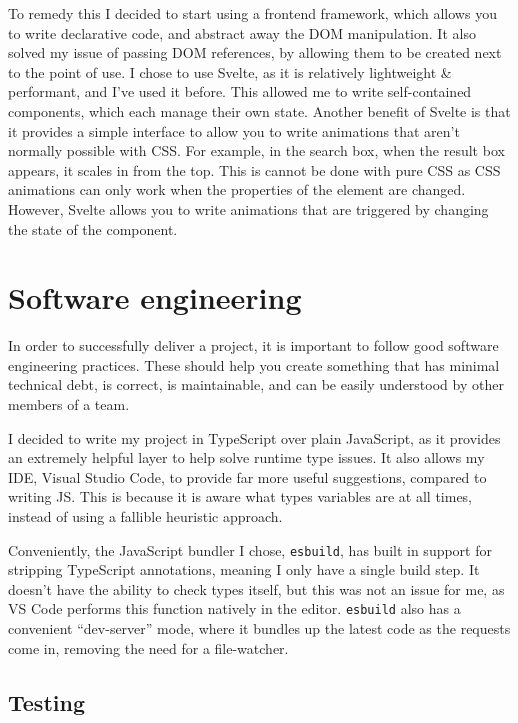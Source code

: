 \documentclass[hyphens]{final_report}
\begin{document}
To remedy this I decided to start using a frontend framework, which allows you to write declarative code, and abstract away the DOM manipulation. It also solved my issue of passing DOM references, by allowing them to be created next to the point of use. I chose to use Svelte, as it is relatively lightweight \& performant, and I've used it before. This allowed me to write self-contained components, which each manage their own state. Another benefit of Svelte is that it provides a simple interface to allow you to write animations that aren't normally possible with CSS\@. For example, in the search box, when the result box appears, it scales in from the top. This is cannot be done with pure CSS as CSS animations can only work when the properties of the element are changed. However, Svelte allows you to write animations that are triggered by changing the state of the component.



\clearpage
\chapter{Software engineering}\label{sec:software-engineering}

In order to successfully deliver a project, it is important to follow good software engineering practices. These should help you create something that has minimal technical debt, is correct, is maintainable, and can be easily understood by other members of a team.

I decided to write my project in TypeScript over plain JavaScript, as it provides an extremely helpful layer to help solve runtime type issues. It also allows my IDE, Visual Studio Code, to provide far more useful suggestions, compared to writing JS\@. This is because it is aware what types variables are at all times, instead of using a fallible heuristic approach.

Conveniently, the JavaScript bundler I chose, \texttt{esbuild}, has built in support for stripping TypeScript annotations, meaning I only have a single build step. It doesn't have the ability to check types itself, but this was not an issue for me, as VS Code performs this function natively in the editor. \texttt{esbuild} also has a convenient ``dev-server'' mode, where it bundles up the latest code as the requests come in, removing the need for a file-watcher.

\section{Testing}
\end{document}
